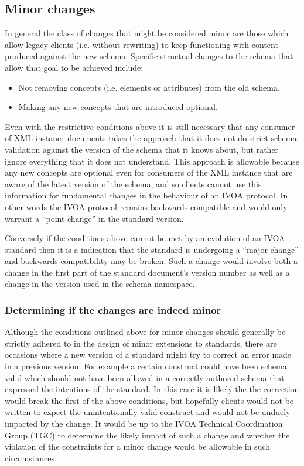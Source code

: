 \documentclass[10pt,a4paper]{ivoa}
\begin{document}
\subsection{Minor changes}
In general the class of changes that might be considered minor are those
which allow legacy clients (i.e. without rewriting) to keep functioning with
content produced against the new schema.
Specific structual changes to the schema that allow that goal to be achieved
include:

\begin{itemize}
  \item Not removing concepts (i.e. elements or attributes) from the old
  schema.
  \item Making any new concepts that are introduced optional.
\end{itemize}
Even with the restrictive conditions above it is still necessary that any
consumer of XML instance documents takes the approach that it does not do strict
schema validation against the version of the schema that it knows about, but
rather ignore everything that it does not understand. This approach is allowable
because any new concepts are optional even for consumers of the XML instance
that are aware of the latest version of the schema, and so clients cannot use
this information for fundamental changes in the behaviour of an IVOA protocol.
In other words the IVOA protocol remains backwards compatible and would only
warrant a ``point change'' in the standard version.

Conversely if the conditions above cannot be met by an evolution of an IVOA
standard then it is a indication that the standard is undergoing a ``major
change'' and backwards compatibility may be broken. Such a change would
involve both a change in the first part of the standard document's version
 number as well as a change in the version used in the schema
namespace.
\subsubsection{Determining if the changes are indeed minor}
Although the conditions outlined above for minor changes should generally be
strictly adhered to in the design of minor extensions to standards, there are
occasions where a new version of a standard might try to correct an error made
in a previous version. For example a certain construct could have been
schema valid which should not have been allowed in a correctly authored
schema that expressed the intentions of the standard. In this case it is likely
the the correction would break the first of the above conditions, but hopefully
clients would not be written to expect the unintentionally valid construct and
would not be unduely impacted by the change. It would be up to the IVOA
Technical Coordination Group (TGC) to determine the likely impact of such a
change and whether the violation of the constraints for a minor change would be
allowable in such circumstances.
\end{document}

